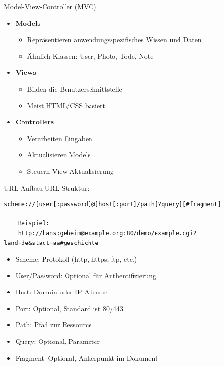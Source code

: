 \begin{concept}{Model-View-Controller (MVC)}
    \begin{itemize}
        \item \textbf{Models}
            \begin{itemize}
                \item Repräsentieren anwendungsspezifisches Wissen und Daten
                \item Ähnlich Klassen: User, Photo, Todo, Note
            \end{itemize}
        \item \textbf{Views}
            \begin{itemize}
                \item Bilden die Benutzerschnittstelle
                \item Meist HTML/CSS basiert
            \end{itemize}
        \item \textbf{Controllers}
            \begin{itemize}
                \item Verarbeiten Eingaben
                \item Aktualisieren Models
                \item Steuern View-Aktualisierung
            \end{itemize}
    \end{itemize}
\end{concept}

\begin{KR}{URL-Aufbau}
    URL-Struktur:
    \begin{lstlisting}[language=Text, style=basesmol]
    scheme://[user[:password]@]host[:port]/path[?query][#fragment]
    
    Beispiel:
    http://hans:geheim@example.org:80/demo/example.cgi?land=de&stadt=aa#geschichte
    \end{lstlisting}

    \begin{itemize}
        \item Scheme: Protokoll (http, https, ftp, etc.)
        \item User/Password: Optional für Authentifizierung
        \item Host: Domain oder IP-Adresse
        \item Port: Optional, Standard ist 80/443
        \item Path: Pfad zur Ressource
        \item Query: Optional, Parameter
        \item Fragment: Optional, Ankerpunkt im Dokument
    \end{itemize}
\end{KR}